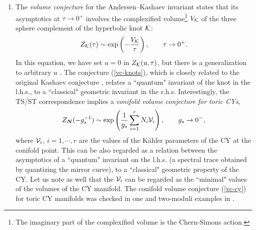 \documentclass[a4paper,11pt]{article}
\theoremstyle{definition}
\newcommand{\CK}{{\cal K}}
\newcommand{\CV}{{\cal V}}
\def\bN{{\boldsymbol{N}}}
\begin{document}
\begin{enumerate}
\item The {\it volume conjecture} for the Andersen--Kashaev invariant
  \cite{ak} states that its asymptotics at $\tau \rightarrow 0^+$
  involves the complexified volume\footnote{The imaginary part of the
    complexified volume is the Chern-Simons action.} $V_{\CK}$ of the
  three sphere complement of the hyperbolic knot $\CK$:
%
  \begin{equation}
    \label{vc-knots}
    Z_{\CK} (\tau) \sim \exp\left(-{V_{\CK} \over \tau} \right),
    \qquad \tau \rightarrow 0^+. 
  \end{equation}
%
  In this equation, we have set $u=0$ in $Z_{\CK} (u, \tau)$, but
  there is a generalization to arbitrary $u$ \cite{gukov,ak}.  The
  conjecture (\ref{vc-knots}), which is closely related to the
  original Kashaev conjecture \cite{kashaev}, relates a ``quantum"
  invariant of the knot in the l.h.s., to a ``classical" geometric
  invariant in the r.h.s. Interestingly, the TS/ST correspondence
  implies a {\it conifold volume conjecture for toric CYs},
%
\begin{equation}
\label{vc-cy}
Z_{\bN}(-g^{-1}_s) \sim \exp \left({1 \over g_s} \sum_{i=1}^r N_i \CV_i  \right), \qquad g_s \rightarrow 0^-, 
\end{equation}
%
where $\CV_i$, $i=1, \cdots, r$ are the values of the K\"ahler parameters of the CY at the conifold point. This can be also regarded 
as a relation between the asymptotics of a ``quantum" invariant 
on the l.h.s. (a spectral trace obtained by quantizing the mirror curve), to a ``classical" geometric property of the CY. Let us note as 
well that the $\CV_i$ can be regarded as the ``minimal" values of the volumes of the CY manifold. The conifold volume conjecture (\ref{vc-cy}) for toric CY manifolds 
was checked in one and two-moduli examples in \cite{mz,kmz,cgm,cgum,kerr}. 


\end{enumerate}
\end{document}
